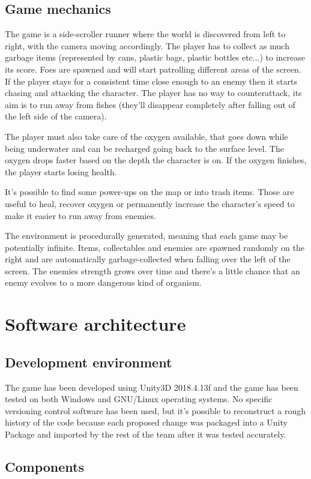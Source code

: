 \documentclass[11pt]{article}
\begin{document}
\subsection{Game mechanics}
The game is a side-scroller runner where the world is discovered from left to right, with the camera moving accordingly.
The player has to collect as much garbage items (represented by cans, plastic bags, plastic bottles etc...) to increase its score.
Foes are spawned and will start patrolling different areas of the screen. If the player stays for a consistent time close enough to an enemy then it starts chasing and attacking the character. The player has no way to counterattack, its aim is to run away from fishes (they'll disappear completely after falling out of the left side of the camera).

The player must also take care of the oxygen available, that goes down while being underwater and can be recharged going back to the surface level. The oxygen drops faster based on the depth the character is on.
If the oxygen finishes, the player starts losing health.

It's possible to find some power-ups on the map or into trash items.
Those are useful to heal, recover oxygen or permanently increase the character's speed to make it easier to run away from enemies.

The environment is procedurally generated, meaning that each game may be potentially infinite. Items, collectables and enemies are spawned randomly on the right and are automatically garbage-collected when falling over the left of the screen.
The enemies strength grows over time and there's a little chance that an enemy evolves to a more dangerous kind of organism.

\section{Software architecture}
\subsection{Development environment}
The game has been developed using Unity3D 2018.4.13f and the game has been tested on both Windows and GNU/Linux operating systems. No specific versioning control software has been used, but it's possible to reconstruct a rough history of the code because each proposed change was packaged into a Unity Package and imported by the rest of the team after it was tested accurately.

\subsection{Components}
\end{document}
